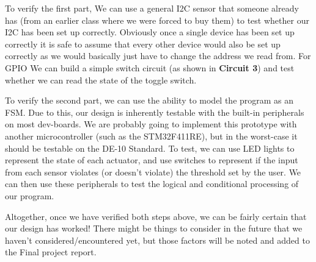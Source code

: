 \documentclass[]{report}
\begin{document}
To verify the first part, We can use a general I2C sensor that someone already has (from an earlier class where we were forced to buy them) to test whether our I2C has been set up correctly. Obviously once a single device has been set up correctly it is safe to assume that every other device would also be set up correctly as we would basically just have to change the address we read from. For GPIO We can build a simple switch circuit (as shown in \textbf{Circuit 3}) and test whether we can read the state of the toggle switch.

To verify the second part, we can use the ability to model the program as an FSM. Due to this, our design is inherently testable with the built-in peripherals on most dev-boards. We are probably going to implement this prototype with another microcontroller (such as the STM32F411RE), but in the worst-case it should be testable on the DE-10 Standard. To test, we can use LED lights to represent the state of each actuator, and use switches to represent if the input from each sensor violates (or doesn't violate) the threshold set by the user. We can then use these peripherals to test the logical and conditional processing of our program. 

Altogether, once we have verified both steps above, we can be fairly certain that our design has worked! There might be things to consider in the future that we haven't considered/encountered yet, but those factors will be noted and added to the Final project report. 
\end{document}
